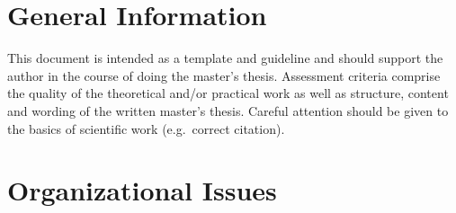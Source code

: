 \label{ch:intro}

\section{General Information}

This document is intended as a template and guideline and should support the
author in the course of doing the master's thesis.
Assessment criteria comprise the quality of the theoretical and/or practical
work as well as structure, content and wording of the written master's thesis.
Careful attention should be given to the basics of scientific work
(e.g.\ correct citation).

\section{Organizational Issues}

